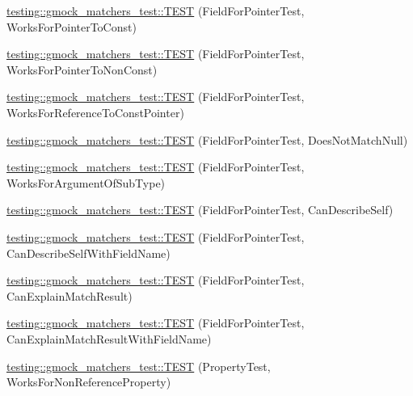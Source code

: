 \begin{DoxyCompactItemize}
\item 
\mbox{\hyperlink{namespacetesting_1_1gmock__matchers__test_af5c12cdd12f8778074ad0714b83858ed}{testing\+::gmock\+\_\+matchers\+\_\+test\+::\+T\+E\+ST}} (Field\+For\+Pointer\+Test, Works\+For\+Pointer\+To\+Const)
\item 
\mbox{\hyperlink{namespacetesting_1_1gmock__matchers__test_ac339a26bf6100a2eb2dd4bf908f8448c}{testing\+::gmock\+\_\+matchers\+\_\+test\+::\+T\+E\+ST}} (Field\+For\+Pointer\+Test, Works\+For\+Pointer\+To\+Non\+Const)
\item 
\mbox{\hyperlink{namespacetesting_1_1gmock__matchers__test_a603253edc7a2310c8a1db225cb589a99}{testing\+::gmock\+\_\+matchers\+\_\+test\+::\+T\+E\+ST}} (Field\+For\+Pointer\+Test, Works\+For\+Reference\+To\+Const\+Pointer)
\item 
\mbox{\hyperlink{namespacetesting_1_1gmock__matchers__test_a06a1c8d949707ab606627e9f6efe87b9}{testing\+::gmock\+\_\+matchers\+\_\+test\+::\+T\+E\+ST}} (Field\+For\+Pointer\+Test, Does\+Not\+Match\+Null)
\item 
\mbox{\hyperlink{namespacetesting_1_1gmock__matchers__test_a5447541a290e16a81aec6dd975983d57}{testing\+::gmock\+\_\+matchers\+\_\+test\+::\+T\+E\+ST}} (Field\+For\+Pointer\+Test, Works\+For\+Argument\+Of\+Sub\+Type)
\item 
\mbox{\hyperlink{namespacetesting_1_1gmock__matchers__test_a056670af8fc7bd3dfd170435dbf08c3c}{testing\+::gmock\+\_\+matchers\+\_\+test\+::\+T\+E\+ST}} (Field\+For\+Pointer\+Test, Can\+Describe\+Self)
\item 
\mbox{\hyperlink{namespacetesting_1_1gmock__matchers__test_ac1ff62c6b02c5267c3437c72f62bc8c7}{testing\+::gmock\+\_\+matchers\+\_\+test\+::\+T\+E\+ST}} (Field\+For\+Pointer\+Test, Can\+Describe\+Self\+With\+Field\+Name)
\item 
\mbox{\hyperlink{namespacetesting_1_1gmock__matchers__test_a6a4ffd283f91f4e085aa582aedefe38e}{testing\+::gmock\+\_\+matchers\+\_\+test\+::\+T\+E\+ST}} (Field\+For\+Pointer\+Test, Can\+Explain\+Match\+Result)
\item 
\mbox{\hyperlink{namespacetesting_1_1gmock__matchers__test_a1f0a8f314a858edb7144d2af8e8bdb66}{testing\+::gmock\+\_\+matchers\+\_\+test\+::\+T\+E\+ST}} (Field\+For\+Pointer\+Test, Can\+Explain\+Match\+Result\+With\+Field\+Name)
\item 
\mbox{\hyperlink{namespacetesting_1_1gmock__matchers__test_a9c42c3b244c7b4d63040e469d5b31e1e}{testing\+::gmock\+\_\+matchers\+\_\+test\+::\+T\+E\+ST}} (Property\+Test, Works\+For\+Non\+Reference\+Property)
\item 

\end{DoxyCompactItemize}
